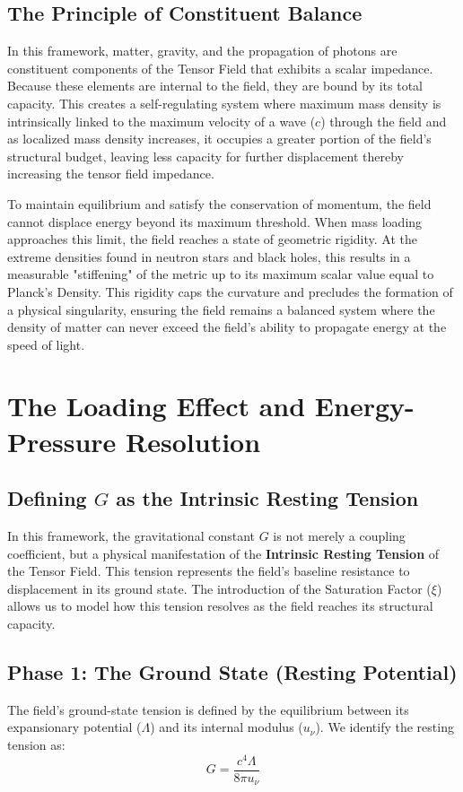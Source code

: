 \documentclass{article}
\begin{document}
\subsection{The Principle of Constituent Balance}
In this framework, matter, gravity, and the propagation of photons are constituent components of the Tensor Field that exhibits a scalar impedance.  Because these elements are internal to the field, they are bound by its total capacity. This creates a self-regulating system where maximum mass density is intrinsically linked to the maximum velocity of a wave ($c$) through the field and as localized mass density increases, it occupies a greater portion of the field's structural budget, leaving less capacity for further displacement thereby increasing the tensor field impedance. 

To maintain equilibrium and satisfy the conservation of momentum, the field cannot displace energy beyond its maximum threshold. When mass loading approaches this limit, the field reaches a state of geometric rigidity. At the extreme densities found in neutron stars and black holes, this results in a measurable "stiffening" of the metric up to its maximum scalar value equal to Planck's Density. This rigidity caps the curvature and precludes the formation of a physical singularity, ensuring the field remains a balanced system where the density of matter can never exceed the field's ability to propagate energy at the speed of light.

\section{The Loading Effect and Energy-Pressure Resolution}

\subsection{Defining $G$ as the Intrinsic Resting Tension}
In this framework, the gravitational constant $G$ is not merely a coupling coefficient, but a physical manifestation of the \textbf{Intrinsic Resting Tension} of the Tensor Field. This tension represents the field's baseline resistance to displacement in its ground state. The introduction of the Saturation Factor ($\xi$) allows us to model how this tension resolves as the field reaches its structural capacity.

\subsection{Phase 1: The Ground State (Resting Potential)}
The field's ground-state tension is defined by the equilibrium between its expansionary potential ($\Lambda$) and its internal modulus ($u_\nu$). We identify the resting tension as:
\begin{equation}
G = \frac{c^4 \Lambda}{8\pi u_\nu}
\end{equation}
\end{document}
